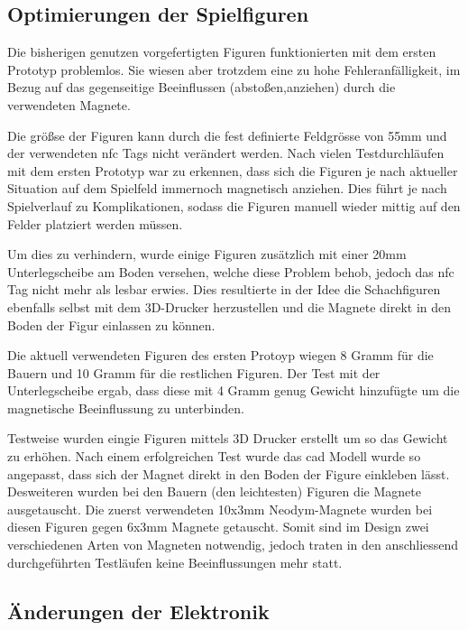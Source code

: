 \hypertarget{optimierungen-der-spielfiguren}{%
\subsection{Optimierungen der
Spielfiguren}\label{optimierungen-der-spielfiguren}}

Die bisherigen genutzen vorgefertigten Figuren funktionierten mit dem
ersten Prototyp problemlos. Sie wiesen aber trotzdem eine zu hohe
Fehleranfälligkeit, im Bezug auf das gegenseitige Beeinflussen
(abstoßen,anziehen) durch die verwendeten Magnete.

Die größse der Figuren kann durch die fest definierte Feldgrösse von
55mm und der verwendeten \gls{nfc} Tags nicht verändert werden. Nach
vielen Testdurchläufen mit dem ersten Prototyp war zu erkennen, dass
sich die Figuren je nach aktueller Situation auf dem Spielfeld immernoch
magnetisch anziehen. Dies führt je nach Spielverlauf zu Komplikationen,
sodass die Figuren manuell wieder mittig auf den Felder platziert werden
müssen.

Um dies zu verhindern, wurde einige Figuren zusätzlich mit einer 20mm
Unterlegscheibe am Boden versehen, welche diese Problem behob, jedoch
das \gls{nfc} Tag nicht mehr als lesbar erwies. Dies resultierte in der
Idee die Schachfiguren ebenfalls selbst mit dem 3D-Drucker herzustellen
und die Magnete direkt in den Boden der Figur einlassen zu können.

Die aktuell verwendeten Figuren des ersten Protoyp wiegen 8 Gramm für
die Bauern und 10 Gramm für die restlichen Figuren. Der Test mit der
Unterlegscheibe ergab, dass diese mit 4 Gramm genug Gewicht hinzufügte
um die magnetische Beeinflussung zu unterbinden.

Testweise wurden eingie Figuren mittels 3D Drucker erstellt um so das
Gewicht zu erhöhen. Nach einem erfolgreichen Test wurde das \gls{cad}
Modell wurde so angepasst, dass sich der Magnet direkt in den Boden der
Figure einkleben lässt. Desweiteren wurden bei den Bauern (den
leichtesten) Figuren die Magnete ausgetauscht. Die zuerst verwendeten
10x3mm Neodym-Magnete wurden bei diesen Figuren gegen 6x3mm Magnete
getauscht. Somit sind im Design zwei verschiedenen Arten von Magneten
notwendig, jedoch traten in den anschliessend durchgeführten Testläufen
keine Beeinflussungen mehr statt.

\hypertarget{uxe4nderungen-der-elektronik}{%
\subsection{Änderungen der
Elektronik}\label{uxe4nderungen-der-elektronik}}

